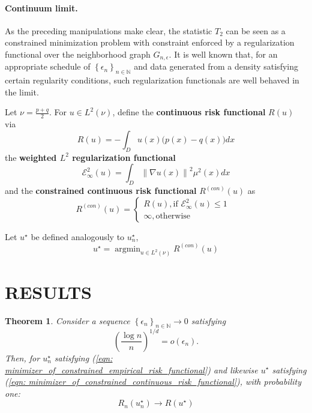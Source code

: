\documentclass{article}
\newcommand{\norm}[1]{\left\lVert#1\right\rVert}
\newcommand{\set}[1]{\left\{#1\right\}}
\newcommand{\seq}[1]{\set{#1}_{n \in \N}}
\DeclareMathOperator*{\argmin}{argmin}
\newcommand{\N}{\mathbb{N}}
\newcommand{\1}{\mathbf{1}}
\theoremstyle{alden}
\theoremstyle{aldenthm}
\newtheorem{theorem}{Theorem}
\theoremstyle{remark}
\begin{document}
\paragraph{Continuum limit.}

As the preceding manipulations make clear, the statistic $T_2$ can be seen as a constrained minimization problem with constraint enforced by a regularization functional over the neighborhood graph $G_{n,\epsilon}$. It is well known that, for an appropriate schedule of $\seq{\epsilon_n}$ and data generated from a density satisfying certain regularity conditions, such regularization functionals are well behaved in the limit. 

Let $\nu = \frac{p + q}{2}$. For $u \in L^2(\nu)$, define the \textbf{continuous risk functional} $R(u)$ via
\begin{equation*}
R(u) = -\int_{D} u(x) \bigl(p(x) - q(x) \bigr) dx
\end{equation*}
the \textbf{weighted $L^2$ regularization functional}
\begin{equation*}
\mathcal{E}_{\infty}^2(u) = \int_D \norm{\nabla u(x)}^2 \mu^2(x) dx
\end{equation*}
and the \textbf{constrained continuous risk functional} $R^{(con)}(u)$ as
\begin{equation*}
R^{(con)}(u) =
\begin{cases}
R(u), \text{if $\mathcal{E}_{\infty}^2(u) \leq 1$ } \\
\infty, \text{otherwise}
\end{cases}
\end{equation*}

Let $u^{\star}$ be defined analogously to $u_n^{\star}$,
\begin{equation}
\label{eqn: minimizer_of_constrained_continuous_risk_functional}
u^{\star} = \argmin_{u \in L^2(\nu)} R^{(con)}(u)
\end{equation}

\section{RESULTS}
\begin{theorem}
	\label{thm: consistency_of_empirical_risk_minimizer}
	Consider a sequence $\seq{\epsilon_n} \to 0$ satisfying
	\begin{equation*}
	\left(\frac{\log n}{n}\right)^{1/d} = o(\epsilon_n).
	\end{equation*}
	Then, for $u_n^{\star}$ satisfying (\ref{eqn: minimizer_of_constrained_empirical_risk_functional}) and likewise $u^{\star}$ satisfying (\ref{eqn: minimizer_of_constrained_continuous_risk_functional}), with probability one:
	\begin{equation}
	R_n(u_n^{\star}) \to R(u^{\star})
	\end{equation}
\end{theorem}
\end{document}
